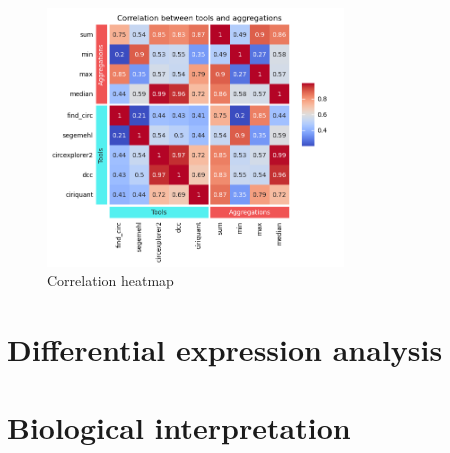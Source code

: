\begin{figure}[ht]
    \centering

    \includegraphics[width=0.7\textwidth]{chapters/4_results_and_discussion/figures/quantification/correlation_heatmap.png}
    \caption{Correlation heatmap
    }
    \label{fig:quantification_correlation_heatmap}
\end{figure}

\section{Differential expression analysis}

\section{Biological interpretation}
